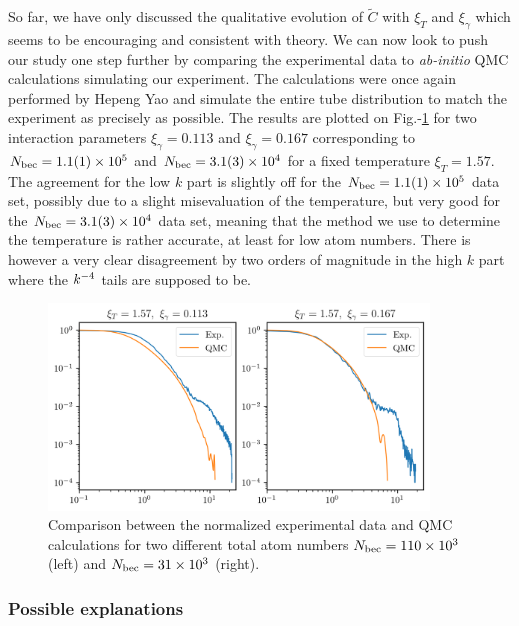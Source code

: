 So far, we have only discussed the qualitative evolution of $\tilde{C}$ with $\xi_T$ and $\xi_{\gamma}$ which seems to be encouraging and consistent with theory. We can now look to push our study one step further by comparing the experimental data to {\it ab-initio} QMC calculations simulating our experiment. The calculations were once again performed by Hepeng Yao and simulate the entire tube distribution to match the experiment as precisely as possible. The results are plotted on Fig.-\ref{fig:1D_QMC_comparison} for two interaction parameters $\xi_{\gamma}=0.113$ and $\xi_{\gamma}=0.167$ corresponding to $N_{\rm{bec}}=1.1(1) \times 10^5$ and $N_{\rm{bec}}=3.1(3) \times 10^4$ for a fixed temperature $\xi_T=1.57$. The agreement for the low $k$ part is slightly off for the $N_{\rm{bec}}=1.1(1) \times 10^5$ data set, possibly due to a slight misevaluation of the temperature, but very good for the $N_{\rm{bec}}=3.1(3) \times 10^4$ data set, meaning that the method we use to determine the temperature is rather accurate, at least for low atom numbers. There is however a very clear disagreement by two orders of magnitude in the high $k$ part where the $k^{-4}$ tails are supposed to be.

\begin{figure}
    \centering
    \includegraphics[width=0.9\textwidth]{Fig/Chapter5/QMC_comparison.png}
    \caption[Comparison between the normalized experimental data and QMC calculations for two different total atom numbers $\NBEC=110 \times 10^3$ and $\NBEC=31 \times 10^3$]{Comparison between the normalized experimental data and QMC calculations for two different total atom numbers $\NBEC=110 \times 10^3$ (left) and $\NBEC=31 \times 10^3$ (right).}
    \label{fig:1D_QMC_comparison}
\end{figure}

\subsubsection{Possible explanations}

